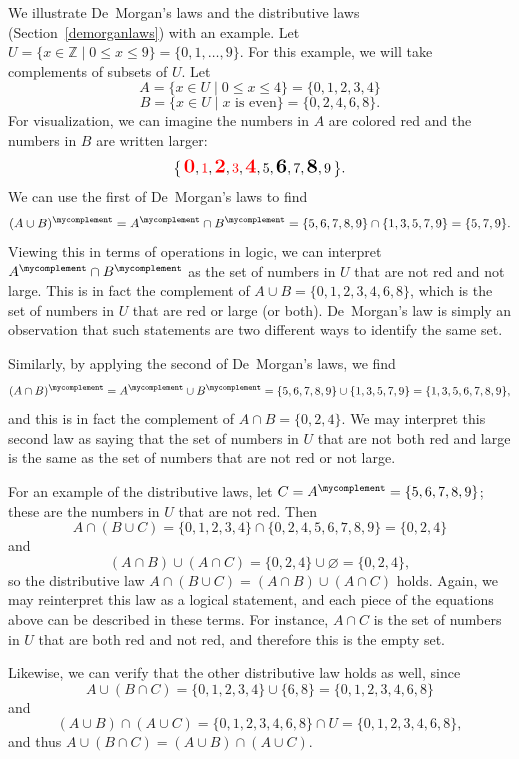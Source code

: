We illustrate De~Morgan's laws and the distributive laws 
(Section~\ref{demorganlaws})
with an example.
Let $U = \{ x \in \mathbb{Z} \mid 0 \leq x \leq 9 \} = \{0,1, \dots, 9\}$.
For this example, we will take complements of subsets of $U$.
Let 
\[A = \{ x \in U \mid 0 \leq x \leq 4 \} = \{ 0, 1, 2, 3, 4 \}\] 
\[B = \{ x \in U \mid x \text{ is even}\} = \{0,2,4,6,8\}.\]
For visualization, we can imagine the numbers in $A$ are colored red and the numbers in $B$ are written larger:
\[
\big\{\,
\textcolor{red}{\Large \textbf{0}},\textcolor{red}{1},\textcolor{red}{\Large\textbf{2}},\textcolor{red}{3},\textcolor{red}{\Large\textbf{4}},5,\textbf{\Large6},7,\textbf{\Large8},9
\,\big\}.
\]
We can use the first of De~Morgan's laws to find
\[
(A \cup B)^\mycomplement = A^\mycomplement \cap B^\mycomplement = \{ 5,6,7,8,9 \} \cap \{ 1,3,5,7,9 \} = \{ 5,7,9 \}.
\]
Viewing this in terms of operations in logic, we can interpret $A^\mycomplement \cap B^\mycomplement$ as the set of numbers in $U$ that are not red and not large.
This is in fact the complement of $A \cup B = \{ 0,1,2,3,4,6,8 \}$, which is the set of numbers in $U$ that are red or large (or both).
De~Morgan's law is simply an observation that such statements are two different ways to identify the same set.

Similarly, by applying the second of De~Morgan's laws, we find
\[
(A \cap B)^\mycomplement = A^\mycomplement \cup B^\mycomplement = \{ 5,6,7,8,9 \} \cup \{ 1,3,5,7,9 \} = \{ 1,3,5,6,7,8,9 \},
\]
and this is in fact the complement of $A \cap B = \{ 0,2,4 \}$.
We may interpret this second law as saying that the set of numbers in $U$ that are not both red and large is the same as the set of numbers that are not red or not large.

For an example of the distributive laws, let $C = A^\mycomplement = \{ 5,6,7,8,9 \}$; these are the numbers in $U$ that are not red.
Then
\[
A \cap (B \cup C) = \{ 0,1,2,3,4 \} \cap \{ 0,2,4,5,6,7,8,9 \} = \{ 0,2,4 \}
\]
and
\[
(A \cap B)\cup(A \cap C) = \{ 0,2,4 \} \cup \varnothing = \{ 0,2,4 \},
\]
so the distributive law $A \cap (B \cup C) = (A \cap B)\cup(A \cap C)$ holds.
Again, we may reinterpret this law as a logical statement, and each piece of the equations above can be described in these terms. 
For instance, $A \cap C$ is the set of numbers in $U$ that are both red and not red, and therefore this is the empty set.


Likewise, we can verify that the other distributive law holds as well, since
\[
A \cup (B \cap C) = \{ 0,1,2,3,4 \} \cup \{ 6,8 \} = \{ 0,1,2,3,4,6,8 \}
\]
and
\[
(A \cup B)\cap(A \cup C) = \{0,1,2,3,4,6,8\} \cap U = \{0,1,2,3,4,6,8\},
\]
and thus $A \cup (B \cap C) = (A \cup B)\cap(A \cup C)$.



